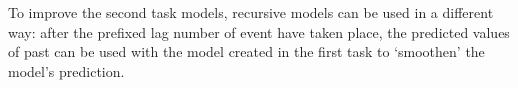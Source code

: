 To improve the second task models, recursive models can be used in a different way: after the prefixed lag number of event have taken place, the predicted values of past can be used with the model created in the first task to `smoothen' the model's prediction. 





\nocite{*}


